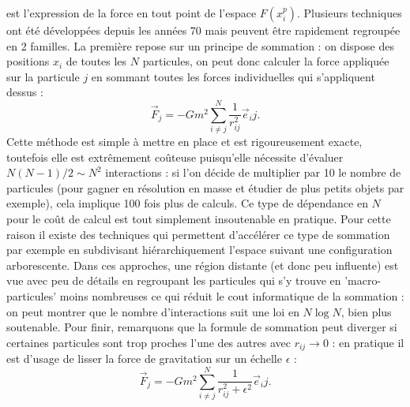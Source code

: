  est l'expression de la force en tout point de l'espace ${F}(x_i^p)$. Plusieurs techniques ont été développées depuis les années 70 mais peuvent être rapidement regroupée en 2 familles. La première repose sur un principe de sommation : on dispose des positions $x_i$ de toutes les $N$ particules, on peut donc calculer la force appliquée sur la particule $j$ en sommant toutes les forces individuelles qui s'appliquent dessus  :
\begin{equation}
\vec F_j=-Gm^2\sum_{i\neq j} ^N\frac{1}{r_{ij}^2}\vec e_ij. 
\end{equation}
Cette méthode est simple à mettre en place et est rigoureusement exacte, toutefois elle est extrêmement coûteuse puisqu'elle nécessite d'évaluer $N(N-1)/2 \sim N^2$ interactions : si l'on décide de multiplier par 10 le nombre de particules (pour gagner en résolution en masse et étudier de plus petits objets par exemple), cela implique 100 fois plus de calculs. Ce type de dépendance en $N$ pour le coût de calcul est tout simplement insoutenable en pratique. Pour cette raison il existe des techniques qui permettent d'accélérer ce type de sommation par exemple en subdivisant hiérarchiquement l'espace suivant une configuration arborescente. Dans ces approches, une région distante (et donc peu influente) est vue avec peu de détails en regroupant les particules qui s'y trouve en 'macro-particules' moins nombreuses ce qui réduit le cout informatique de la sommation : on peut montrer que le nombre d'interactions suit une loi en $N\log N$, bien plus soutenable. Pour finir, remarquons que la formule de sommation peut diverger si certaines particules sont trop proches l'une des autres avec $r_{ij}\rightarrow 0$ : en pratique il est d'usage de lisser la force de gravitation sur un échelle $\epsilon$ :
\begin{equation}
\vec F_j=-Gm^2\sum_{i\neq j} ^N\frac{1}{r_{ij}^2+\epsilon^2}\vec e_ij. 
\end{equation}

